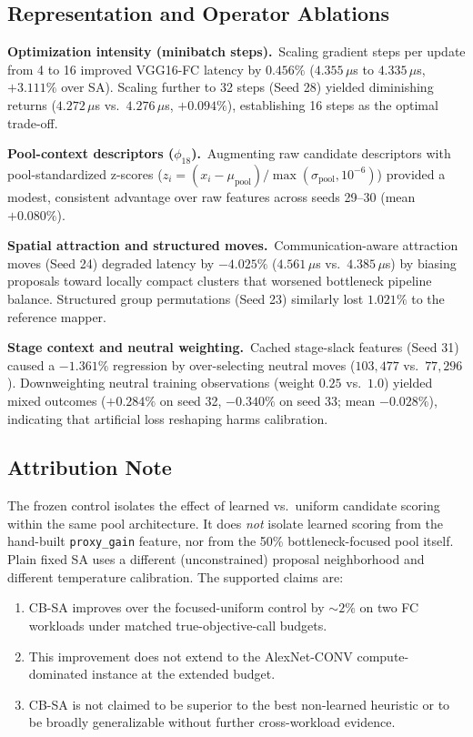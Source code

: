 \documentclass[10pt,conference]{IEEEtran}
\begin{document}
\subsection{Representation and Operator Ablations}
\label{sec:ablations-rep}

\textbf{Optimization intensity (minibatch steps).}\
Scaling gradient steps per update from 4 to 16 improved VGG16-FC latency by
$0.456\%$ ($4.355\,\mu$s to $4.335\,\mu$s, $+3.111\%$ over SA).  Scaling further
to 32 steps (Seed 28) yielded diminishing returns ($4.272\,\mu$s vs.\ $4.276\,\mu$s,
$+0.094\%$), establishing 16 steps as the optimal trade-off.

\textbf{Pool-context descriptors ($\phi_{18}$).}\
Augmenting raw candidate descriptors with pool-standardized z-scores
($z_i = (x_i - \mu_{\text{pool}}) / \max(\sigma_{\text{pool}}, 10^{-6})$) provided a
modest, consistent advantage over raw features across seeds 29--30 (mean $+0.080\%$).

\textbf{Spatial attraction and structured moves.}\
Communication-aware attraction moves (Seed 24) degraded latency by $\mathbf{-4.025\%}$
($4.561\,\mu$s vs.\ $4.385\,\mu$s) by biasing proposals toward locally compact
clusters that worsened bottleneck pipeline balance.  Structured group permutations
(Seed 23) similarly lost $1.021\%$ to the reference mapper.

\textbf{Stage context and neutral weighting.}\
Cached stage-slack features (Seed 31) caused a $-1.361\%$ regression by over-selecting
neutral moves ($103,477$ vs.\ $77,296$).  Downweighting neutral training observations
(weight $0.25$ vs.\ $1.0$) yielded mixed outcomes ($+0.284\%$ on seed 32, $-0.340\%$
on seed 33; mean $-0.028\%$), indicating that artificial loss reshaping harms calibration.

\subsection{Attribution Note}

The frozen control isolates the effect of learned vs.\ uniform candidate
scoring within the same pool architecture.  It does \emph{not} isolate learned
scoring from the hand-built \texttt{proxy\_gain} feature, nor from the 50\%
bottleneck-focused pool itself.  Plain fixed SA uses a different (unconstrained)
proposal neighborhood and different temperature calibration.  The supported
claims are:

\begin{enumerate}
  \item CB-SA improves over the focused-uniform control by ${\sim}2\%$ on
        two FC workloads under matched true-objective-call budgets.
  \item This improvement does not extend to the AlexNet-CONV compute-dominated
        instance at the extended budget.
  \item CB-SA is not claimed to be superior to the best non-learned heuristic
        or to be broadly generalizable without further cross-workload evidence.
\end{enumerate}
\end{document}
